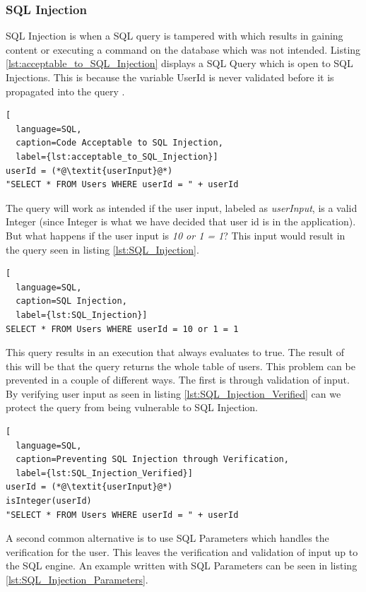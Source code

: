 \subsubsection{SQL Injection}
SQL Injection is when a SQL query is tampered with which results in gaining content or executing a command on the database which was not intended. Listing \ref{lst:acceptable_to_SQL_Injection} displays a SQL Query which is open to SQL Injections. This is because the variable UserId is never validated before it is propagated into the query \parencite{JustinClarke-Salt2009SIAa, Secure_Web}.

\hfill
\begin{lstlisting}[
  language=SQL,
  caption=Code Acceptable to SQL Injection,
  label={lst:acceptable_to_SQL_Injection}]
userId = (*@\textit{userInput}@*)
"SELECT * FROM Users WHERE userId = " + userId
\end{lstlisting}
\hfill

The query will work as intended if the user input, labeled as \textit{userInput}, is a valid Integer (since Integer is what we have decided that user id is in the application). But what happens if the user input is \textit{10 or 1 = 1}? This input would result in the query seen in listing \ref{lst:SQL_Injection}.

\hfill
\begin{lstlisting}[
  language=SQL,
  caption=SQL Injection,
  label={lst:SQL_Injection}]
SELECT * FROM Users WHERE userId = 10 or 1 = 1
\end{lstlisting}
\hfill

This query results in an execution that always evaluates to true. The result of this will be that the query returns the whole table of users. This problem can be prevented in a couple of different ways. The first is through validation of input. By verifying user input as seen in listing \ref{lst:SQL_Injection_Verified} can we protect the query from being vulnerable to SQL Injection.

\hfill
\begin{lstlisting}[
  language=SQL,
  caption=Preventing SQL Injection through Verification,
  label={lst:SQL_Injection_Verified}]
userId = (*@\textit{userInput}@*)
isInteger(userId)
"SELECT * FROM Users WHERE userId = " + userId
\end{lstlisting}
\hfill

A second common alternative is to use SQL Parameters which handles the verification for the user. This leaves the verification and validation of input up to the SQL engine. An example written with SQL Parameters can be seen in listing \ref{lst:SQL_Injection_Parameters}.

